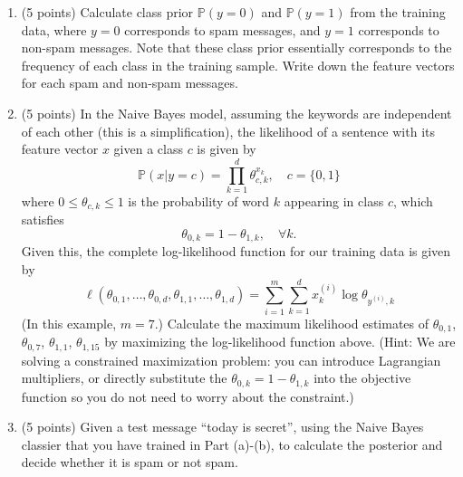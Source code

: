 \documentclass[twoside,10pt]{article}
\begin{document}
\begin{enumerate}
\begin{enumerate}
\item (5 points) Calculate class prior $\mathbb P(y = 0)$ and $\mathbb P(y = 1)$ from the training data, where $y = 0$ corresponds to spam messages, and $y = 1$ corresponds to non-spam messages. Note that these class prior essentially corresponds to the frequency of each class in the training sample. Write down the feature vectors for each spam and non-spam messages.
\item (5 points) In the Naive Bayes model, assuming the keywords are independent of each other (this is a simplification), the likelihood of a sentence with its feature vector $x$ given a class $c$ is given by 
\[
\mathbb P (x|y = c) = \prod_{k=1}^d \theta_{c, k}^{x_k}, \quad c = \{0, 1\}
\]
where $0 \leq \theta_{c,k} \leq 1$ is the probability of word $k$ appearing in class $c$, which satisfies 
\[\theta_{0,k} = 1- \theta_{1, k} , \quad \forall k.\] Given this, the complete log-likelihood function for our training data is given by
\[
\ell(\theta_{0,1}, \ldots, \theta_{0, d}, \theta_{1,1}, \ldots, \theta_{1, d}) = 
\sum_{i=1}^m \sum_{k=1}^d x_k^{(i)} \log \theta_{y^{(i)}, k}
\]
(In this example, $m = 7$.)
 Calculate the maximum likelihood estimates of $\theta_{0,1}$, $\theta_{0,7}$, $\theta_{1,1}$, $\theta_{1,15}$ by maximizing the log-likelihood function above.
 (Hint: We are solving a constrained maximization problem: you can introduce Lagrangian multipliers, or directly substitute the $\theta_{0,k} = 1- \theta_{1, k}$ into the objective function so you do not need to worry about the constraint.)
\item (5 points) Given a test message ``\textsf{today is secret}'', using the Naive Bayes classier that you have trained in Part (a)-(b), to calculate the posterior and decide whether it is spam or not spam.

\end{enumerate}


\end{enumerate}
\end{document}
